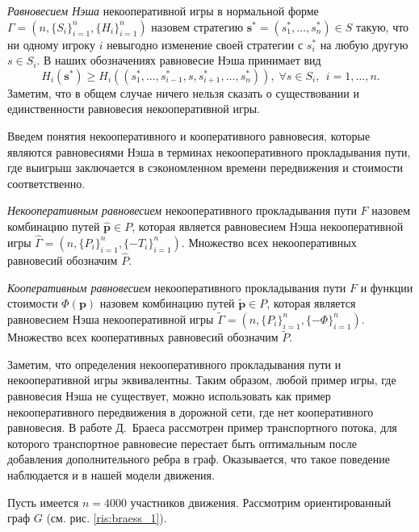 \documentclass[12pt, a4paper]{article}
\begin{document}
\textit{Равновесием Нэша} некооперативной игры в нормальной форме $\Gamma = (n, \{S_i\}_{i = 1}^n, \{H_i\}_{i = 1}^n)$ назовем стратегию $\textbf{s}^* = (s^*_1,\dots, s^*_n) \in S$ такую, что ни одному игроку $i$ невыгодно изменение своей стратегии с $s_i^*$ на любую другую $s \in S_i$. В наших обозначениях равновесие Нэша принимает вид
$$H_i(\textbf{s}^*) \ge H_i(\left(s^*_1, \ldots, s^*_{i - 1}, s, s^*_{i + 1}, \ldots, s^*_{n} \right)), \; \forall s \in S_i, \; \, i = 1, \dots, n. $$ 
Заметим, что в общем случае ничего нельзя сказать о существовании и единственности равновесия некооперативной игры.

Введем понятия некооперативного и кооперативного равновесия, которые являются равновесиями Нэша в терминах некооперативного прокладывания пути, где выигрыш заключается в сэкономленном времени передвижения и стоимости соответственно.

\textit{Некооперативным равновесием} некооперативного прокладывания пути $F$ назовем комбинацию путей $\widehat{\textbf{p}} \in P$, которая является равновесием Нэша некооперативной игры $\widehat{\Gamma} = (n, \{P_i\}_{i = 1}^n, \{-T_i\}_{i = 1}^n)$. Множество всех некооперативных равновесий обозначим $\widehat{P}$.

\textit{Кооперативным равновесием} некооперативного прокладывания пути $F$ и функции стоимости $\Phi (\textbf{p})$ назовем комбинацию путей $\widetilde{\textbf{p}} \in P$, которая является равновесием Нэша некооперативной игры $\widetilde{\Gamma} = (n, \{P_i\}_{i = 1}^n, \{-\Phi\}_{i = 1}^n)$. Множество всех кооперативных равновесий обозначим $\widetilde{P}$.

Заметим, что определения некооперативного прокладывания пути и некооперативной игры эквивалентны.  
Таким образом, любой пример игры, где равновесия Нэша не существует, можно использовать как пример некооперативного передвижения в дорожной сети, где нет кооперативного равновесия.
В работе Д.~Браеса \cite{braess2} рассмотрен пример транспортного потока, для которого транспортное равновесие перестает быть оптимальным после добавления дополнительного ребра в граф. Оказывается, что такое поведение наблюдается и в нашей модели движения.

Пусть имеется $n = 4000$ участников движения. Рассмотрим ориентированный граф $G$ (см. рис. \ref{ris:braess_1}). 
\end{document}
